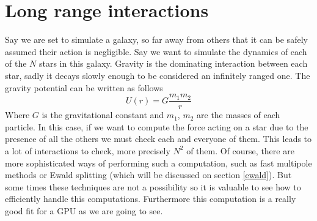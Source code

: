 \documentclass[ twoside,openright,titlepage,numbers=noenddot,%
headinclude,footinclude,cleardoublepage=empty,abstract=on,
BCOR=5mm,paper=a4,fontsize=11pt, dvipsnames
]{scrreprt}
\begin{document}
\section{Long range interactions}
Say we are set to simulate a galaxy, so far away from others that it can be safely assumed their action is negligible. Say we want to simulate the dynamics of each of the $N$ stars in this galaxy. Gravity is the dominating interaction between each star, sadly it decays slowly enough to be considered an infinitely ranged one. The gravity potential can be written as follows
\begin{equation}
  \label{eq:gravity}
  U(r) = G\frac{m_1m_2}{r}
\end{equation}
Where $G$ is the gravitational constant and $m_1$, $m_2$ are the masses of each particle.
In this case, if we want to compute the force acting on a star due to the presence of all the others we must check each and everyone of them. This leads to a lot of interactions to check, more precisely $N^2$ of them. Of course, there are more sophisticated ways of performing such a computation, such as fast multipole methods \cite{fmm} or Ewald splitting (which will be discussed on section \ref{ewald}). But some times these techniques are not a possibility so it is valuable to see how to efficiently handle this computations.
Furthermore this computation is a really good fit for a \gls{GPU} as we are going to see.
\end{document}
